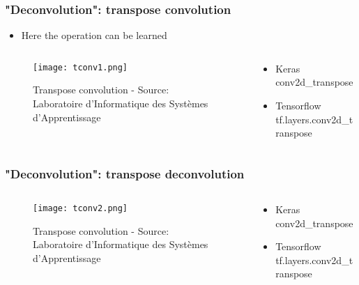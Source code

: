 \documentclass{beamer}
\begin{document}
\begin{frame}
	\frametitle{"Deconvolution": transpose convolution}
    \begin{itemize}
    \item Here the operation can be learned
    \end{itemize}
    \begin{columns}[t]
    \begin{column}{.6\textwidth}
    \begin{block}{}
    \begin{figure}
		\texttt{[image: tconv1.png]}
		\caption{Transpose convolution - Source: Laboratoire d'Informatique des Systèmes d'Apprentissage}
	\end{figure}
    \end{block}
    \end{column}
    \begin{column}{.4\textwidth}
    \begin{block}{}
    \begin{itemize}
    	\item Keras
        conv2d\_transpose
        \item Tensorflow
       tf.layers.conv2d\_transpose
    \end{itemize}
    \end{block}
    \end{column}
    \end{columns}
\end{frame}

\begin{frame}
	\frametitle{"Deconvolution": transpose deconvolution}
    \begin{columns}[t]
    \begin{column}{.6\textwidth}
    \begin{block}{}
    \begin{figure}
		\texttt{[image: tconv2.png]}
		\caption{Transpose convolution - Source: Laboratoire d'Informatique des Systèmes d'Apprentissage}
	\end{figure}
    \end{block}
    \end{column}
    \begin{column}{.4\textwidth}
    \begin{block}{}
    \begin{itemize}
    	\item Keras
        conv2d\_transpose
        \item Tensorflow
       tf.layers.conv2d\_transpose
    \end{itemize}
    \end{block}
    \end{column}
    \end{columns}
\end{frame}
\end{document}
